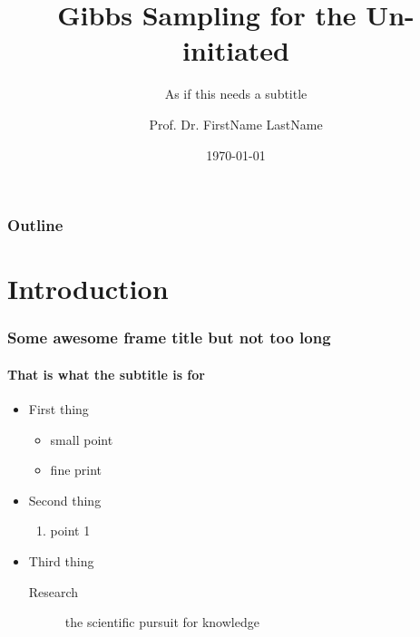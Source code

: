 \documentclass{beamer}
\title{Gibbs Sampling for the Un-initiated}
\subtitle{As if this needs a subtitle}
\author{Prof. Dr. FirstName LastName}
\date{\today}
\institute{\url{email@some-cool-place.ext}\\\url{http://www.cool-url.com}}
\begin{document}
\begin{frame}[plain,t]
\titlepage
\end{frame}

\begin{frame}%
	\frametitle{Outline}
\tableofcontents
\end{frame}


\section{Introduction}
\begin{frame}
\frametitle{Some awesome frame title but not too long}
\framesubtitle{That is what the subtitle is for}
\begin{itemize}
\item First thing
	\begin{itemize}
	\item small point
	\item fine print
	\end{itemize}
\item Second thing
	\begin{enumerate}
	\item point 1
	\end{enumerate}
\item Third thing
	\begin{description}
	\item[Research] the scientific pursuit for knowledge
	\end{description}
\end{itemize}
\end{frame}
%
%
%
%
%
%
\end{document}
